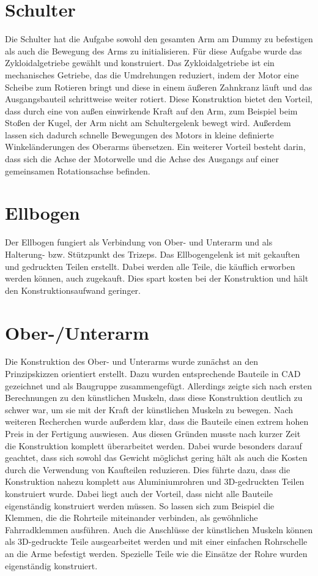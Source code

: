 	\section{Schulter}
		Die Schulter hat die Aufgabe sowohl den gesamten Arm am Dummy zu befestigen als auch die Bewegung des Arms zu initialisieren.
		Für diese Aufgabe wurde das Zykloidalgetriebe gewählt und konstruiert.
		Das Zykloidalgetriebe ist ein mechanisches Getriebe, das die Umdrehungen reduziert, indem der Motor eine Scheibe zum Rotieren bringt und diese in einem äußeren Zahnkranz läuft und das Ausgangsbauteil schrittweise weiter rotiert.
		Diese Konstruktion bietet den Vorteil, dass durch eine von außen einwirkende Kraft auf den Arm, zum Beispiel beim Stoßen der Kugel, der Arm nicht am Schultergelenk bewegt wird.
		Außerdem lassen sich dadurch schnelle Bewegungen des Motors in kleine definierte Winkeländerungen des Oberarms übersetzen.
		Ein weiterer Vorteil besteht darin, dass sich die Achse der Motorwelle und die Achse des Ausgangs auf einer gemeinsamen Rotationsachse befinden.

	
	\section{Ellbogen}
		Der Ellbogen fungiert als Verbindung von Ober- und Unterarm und als Halterung- bzw. Stützpunkt des Trizeps.
		Das Ellbogengelenk ist mit gekauften und gedruckten Teilen erstellt.
		Dabei werden alle Teile, die käuflich erworben werden können, auch zugekauft.
		Dies spart kosten bei der Konstruktion und hält den Konstruktionsaufwand geringer.
	
	\section{Ober-/Unterarm}
		Die Konstruktion des Ober- und Unterarms wurde zunächst an den Prinzipskizzen orientiert erstellt.
		Dazu wurden entsprechende Bauteile in CAD gezeichnet und als Baugruppe zusammengefügt.
		Allerdings zeigte sich nach ersten Berechnungen zu den künstlichen Muskeln, dass diese Konstruktion deutlich zu schwer war, um sie mit der Kraft der künstlichen Muskeln zu bewegen.
		Nach weiteren Recherchen wurde außerdem klar, dass die Bauteile einen extrem hohen Preis in der Fertigung auswiesen.
		Aus diesen Gründen musste nach kurzer Zeit die Konstruktion komplett überarbeitet werden.
		Dabei wurde besonders darauf geachtet, dass sich sowohl das Gewicht möglichst gering hält als auch die Kosten durch die Verwendung von Kaufteilen reduzieren.
		Dies führte dazu, dass die Konstruktion nahezu komplett aus Aluminiumrohren und 3D-gedruckten Teilen konstruiert wurde.
		Dabei liegt auch der Vorteil, dass nicht alle Bauteile eigenständig konstruiert werden müssen.
		So lassen sich zum Beispiel die Klemmen, die die Rohrteile miteinander verbinden, als gewöhnliche Fahrradklemmen ausführen.
		Auch die Anschlüsse der künstlichen Muskeln können als 3D-gedruckte Teile ausgearbeitet werden und mit einer einfachen Rohrschelle an die Arme befestigt werden.
		Spezielle Teile wie die Einsätze der Rohre wurden eigenständig konstruiert.\\

